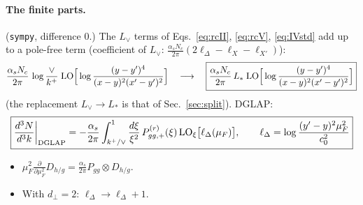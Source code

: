 \documentclass[10pt]{article}
\numberwithin{equation}{section}
\newcommand{\Lv}{L_{\vee}}
\newcommand{\Ls}{L_{*}}
\newcommand{\LOx}[1]{{\rm LO}_\xi\big[#1\big]}
\begin{document}
\paragraph{The finite parts.} (\texttt{sympy}, difference $0$.) The $\Lv$ terms of Eqs.~\eqref{eq:rcII}, \eqref{eq:rcV}, \eqref{eq:IVstd} add up to a pole-free term (coefficient of $\Lv$: $\frac{\alpha_sN_c}{2\pi}(2\ell_\Delta-\ell_X-\ell_{X'})$):
\begin{equation}
\frac{\alpha_sN_c}{2\pi}\,\log\frac{\vee}{k^+}\;{\rm LO}\Big[\log\frac{(y-y')^4}{(x-y)^2(x'-y')^2}\Big]\quad\longrightarrow\quad\boxed{\frac{\alpha_sN_c}{2\pi}\,\Ls\;{\rm LO}\Big[\log\frac{(y-y')^4}{(x-y)^2(x'-y')^2}\Big]}
\label{eq:LvE}
\end{equation}
(the replacement $\Lv\to\Ls$ is that of Sec.~\ref{sec:split}). DGLAP:
\begin{equation}
\boxed{\frac{d^3N}{d^3k}\bigg|_{\rm DGLAP}=-\frac{\alpha_s}{2\pi}\int_{k^+/\vee}^1\frac{d\xi}{\xi^2}\,P^{(r)}_{gg,+}(\xi)\,\LOx{\ell_\Delta(\mu_F)},\qquad\ell_\Delta=\log\frac{(y'-y)^2\mu_F^2}{c_0^2}}
\label{eq:dglap}
\end{equation}
\begin{itemize}
\item $\mu_F^2\frac{\partial}{\partial\mu_F^2}D_{h/g}=\frac{\alpha_s}{2\pi}P_{gg}\otimes D_{h/g}$.
\item With $d_\perp=2$: $\ell_\Delta\to\ell_\Delta+1$.
\end{itemize}
\end{document}
